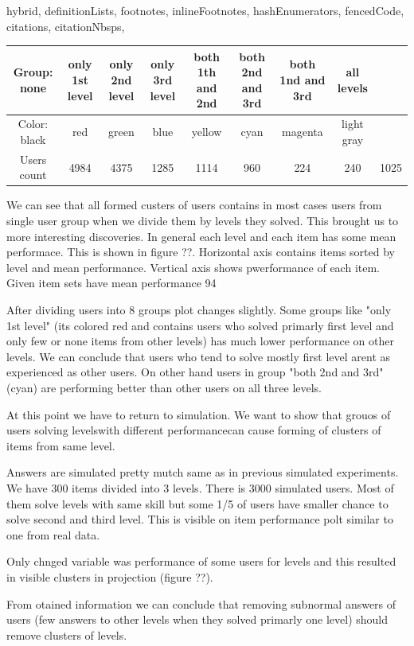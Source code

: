 \documentclass[
  digital, %
  table,   %
  nolof,     %
  nolot,     %
  nocover
]{fithesis3}
\begin{document}
\begin{markdown*}{%
  hybrid,
  definitionLists,
  footnotes,
  inlineFootnotes,
  hashEnumerators,
  fencedCode,
  citations,
  citationNbsps,
}
\begin{center}
 \begin{tabular}{|c|c c c c c c c|}
    \hline
    Group: none & only 1st level & only 2nd level & only 3rd level & both 1th and 2nd & both 2nd and 3rd & both 1nd and 3rd & all levels \\
    \hline
    Color: black & red & green & blue & yellow & cyan & magenta & light gray \\
    \hline
    Users count & 4984 & 4375 & 1285 & 1114 & 960 & 224 & 240 & 1025 \\
    \hline
  \end{tabular}
\end{center}

We can see that all formed custers of users contains in most cases users from single user group when we divide them by levels they solved. This brought us to more interesting discoveries. In general each level and each item has some mean performace. This is shown in figure ??. Horizontal axis contains items sorted by level and mean performance. Vertical axis shows pwerformance of each item. Given item sets have mean performance 94%

After dividing users into 8 groups plot changes slightly. Some groups like "only 1st level" (its colored red and contains users who solved primarly first level and only few or none items from other levels) has much lower performance on other levels. We can conclude that users who tend to solve mostly first level arent as experienced as other users. On other hand users in group "both 2nd and 3rd" (cyan) are performing better than other users on all three levels.

At this point we have to return to simulation. We want to show that grouos of users solving levelswith different performancecan cause forming of clusters of items from same level.

Answers are simulated pretty mutch same as in previous simulated experiments. We have 300 items divided into 3 levels. There is 3000 simulated users. Most of them solve levels with same skill but some 1/5 of users have smaller chance to solve second and third level. This is visible on item performance polt similar to one from real data.

 Only chnged variable was performance of some users for levels and this resulted in visible clusters in projection (figure ??).

From otained information we can conclude that removing subnormal answers of users (few answers to other levels when they solved primarly one level) should remove clusters of levels.


\end{markdown*}
\end{document}
